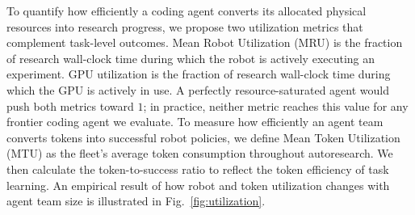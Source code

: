 To quantify how efficiently a coding agent converts its allocated physical resources into research progress, we propose two utilization metrics that complement task-level outcomes. Mean Robot Utilization (MRU) is the fraction of research wall-clock time during which the robot is actively executing an experiment. GPU utilization is the fraction of research wall-clock time during which the GPU is actively in use. 
A perfectly resource-saturated agent would push both metrics toward $1$; in practice, neither metric reaches this value for any frontier coding agent we evaluate. 
To measure how efficiently an agent team converts tokens into successful robot policies, we define Mean Token Utilization (MTU) as the fleet's average token consumption throughout autoresearch. We then calculate the token-to-success ratio to reflect the token efficiency of task learning. An empirical result of how robot and token utilization changes with agent team size is illustrated in Fig.~\ref{fig:utilization}. 



